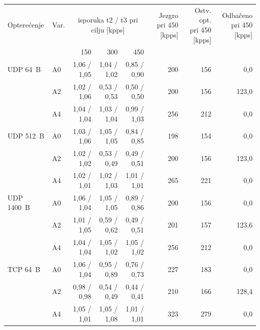 \begin{tabular}{@{}llrrrrrr@{}}
\toprule
Opterećenje & Var. & \multicolumn{3}{c}{isporuka t2 / t3 pri cilju [kpps]} & \makecell{Jezgro pri 450\\{}[kpps]} & \makecell{Ostv. opt.\\pri 450 [kpps]} & \makecell{Odbačeno\\pri 450 [kpps]} \\
\cmidrule(lr){3-5}
 & & 150 & 300 & 450 & & & \\
\midrule
UDP 64~B & A0 & 1{,}06 / 1{,}05 & 1{,}04 / 1{,}02 & 0{,}85 / 0{,}90 & 200 & 156 & 0{,}0 \\
 & A2 & 1{,}02 / 1{,}06 & 0{,}53 / 0{,}53 & 0{,}50 / 0{,}50 & 200 & 156 & 123{,}0 \\
 & A4 & 1{,}04 / 1{,}04 & 1{,}03 / 1{,}04 & 0{,}99 / 1{,}03 & 256 & 212 & 0{,}0 \\
\midrule
UDP 512~B & A0 & 1{,}03 / 1{,}06 & 1{,}05 / 1{,}05 & 0{,}84 / 0{,}85 & 198 & 154 & 0{,}0 \\
 & A2 & 1{,}02 / 1{,}02 & 0{,}53 / 0{,}49 & 0{,}49 / 0{,}51 & 200 & 156 & 123{,}0 \\
 & A4 & 1{,}02 / 1{,}01 & 1{,}02 / 1{,}03 & 1{,}01 / 1{,}01 & 265 & 221 & 0{,}0 \\
\midrule
UDP 1400~B & A0 & 1{,}06 / 1{,}04 & 1{,}05 / 1{,}05 & 0{,}89 / 0{,}86 & 200 & 156 & 0{,}0 \\
 & A2 & 1{,}01 / 1{,}05 & 0{,}59 / 0{,}62 & 0{,}49 / 0{,}51 & 201 & 157 & 123{,}6 \\
 & A4 & 1{,}04 / 1{,}04 & 1{,}05 / 1{,}02 & 1{,}05 / 1{,}02 & 256 & 212 & 0{,}0 \\
\midrule
TCP 64~B & A0 & 1{,}06 / 1{,}04 & 0{,}95 / 0{,}89 & 0{,}76 / 0{,}73 & 227 & 183 & 0{,}0 \\
 & A2 & 0{,}98 / 0{,}98 & 0{,}54 / 0{,}49 & 0{,}44 / 0{,}41 & 210 & 166 & 128{,}4 \\
 & A4 & 1{,}05 / 1{,}01 & 1{,}05 / 1{,}08 & 1{,}01 / 1{,}01 & 323 & 279 & 0{,}0 \\
\bottomrule
\end{tabular}

